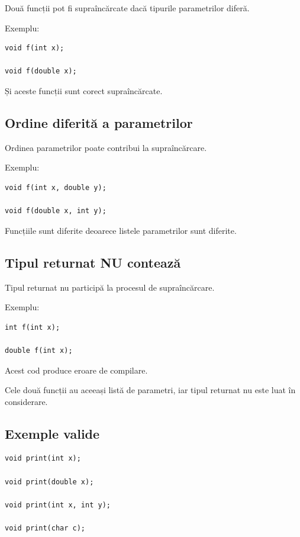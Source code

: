 \documentclass[12pt,a4paper]{article}
\begin{document}
Două funcții pot fi supraîncărcate dacă tipurile parametrilor diferă.

Exemplu:

\begin{verbatim}
void f(int x);

void f(double x);
\end{verbatim}

Și aceste funcții sunt corect supraîncărcate.

\subsection{Ordine diferită a parametrilor}

Ordinea parametrilor poate contribui la supraîncărcare.

Exemplu:

\begin{verbatim}
void f(int x, double y);

void f(double x, int y);
\end{verbatim}

Funcțiile sunt diferite deoarece listele parametrilor sunt diferite.

\subsection{Tipul returnat NU contează}

Tipul returnat nu participă la procesul de supraîncărcare.

Exemplu:

\begin{verbatim}
int f(int x);

double f(int x);
\end{verbatim}

Acest cod produce eroare de compilare.

Cele două funcții au aceeași listă de parametri, iar tipul returnat nu este luat în considerare.

\subsection{Exemple valide}

\begin{verbatim}
void print(int x);

void print(double x);

void print(int x, int y);

void print(char c);
\end{verbatim}
\end{document}
